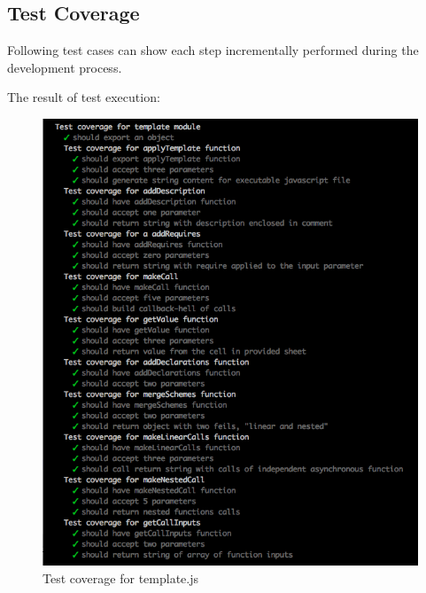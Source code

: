 {\subsection{Test Coverage}
Following test cases can show each step incrementally performed during the development process.

%

The result of test execution:
\begin{figure}[H]
	\centering
	\includegraphics[width=\linewidth]{grafiken/testTemplate.png}
	\caption{Test coverage for template.js}
	\label{fig:testTemplate}
\end{figure}

}
